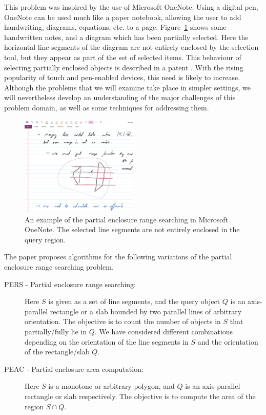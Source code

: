\documentclass[a4paper,11pt]{article}
\newcommand{\PERS}[0]{PERS}
\newcommand{\PEAC}[0]{PEAC}
\begin{document}
This problem was inspired by the use of Microsoft 
OneNote. Using a digital pen, OneNote can be used much like a paper 
notebook, allowing the user to add handwriting, diagrams, equations, 
etc. to a page. 
Figure~\ref{fig:intro:onenote} shows some handwritten notes, and a 
diagram which has been partially selected. Here the horizontal 
line segments of the diagram are not entirely enclosed by 
the selection tool, but they appear as part of the set of selected 
items. This behaviour of selecting partially enclosed objects is 
described in a patent \cite{lassoselect}. 
With the rising popularity of touch and pen-enabled devices, this 
need is likely to increase. Although the problems that we will 
examine take place in simpler settings, we will nevertheless develop 
an understanding of the major challenges of this problem domain, as 
well as some techniques for addressing them.


\begin{figure}[t]
\begin{center}
  \includegraphics[width=0.50\textwidth]{figures/fig_onenote}
  \caption{An example of the partial enclosure range searching in 
  Microsoft OneNote. The selected line segments are not entirely 
  enclosed in the query region.}
  \label{fig:intro:onenote}
\end{center}
\end{figure}

The paper proposes algorithms for the following variations of 
the partial enclosure range searching problem.  
\begin{description}
\item[\PERS{} - Partial enclosure range searching:] Here $S$ 
is given as a set of line segments, and the query object $Q$ 
is an axis-parallel rectangle or a slab bounded by two parallel 
lines of arbitrary orientation. The objective is to count 
the number of objects in $S$ that partially/fully lie in $Q$. We have 
considered different combinations depending on the orientation 
of the line segments in $S$ and the orientation of the 
rectangle/slab $Q$.
\item[\PEAC{} - Partial enclosure area computation:] Here $S$ 
is a monotone or arbitrary polygon, and $Q$ is an axis-parallel 
rectangle or slab respectively. The objective is to compute the 
area of the region $S\cap Q$. 
\end{description}
\end{document}
